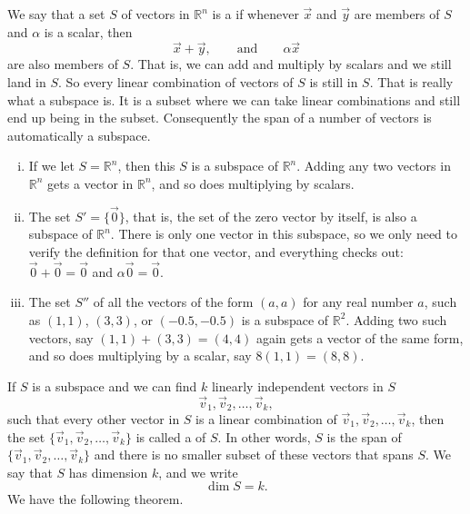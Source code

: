 We say that a set $S$ of vectors in ${\mathbb R}^n$ is a
\emph{} if
whenever $\vec{x}$ and $\vec{y}$ are members of $S$ and
$\alpha$ is a scalar, then
\begin{equation*}
\vec{x} + \vec{y}, \qquad \text{and} \qquad \alpha \vec{x}
\end{equation*}
are also members of $S$.  That is, we can add and multiply by scalars
and we still land in $S$.  So every linear combination of vectors of
$S$ is still in $S$.  That is really what a subspace is.  It is a subset
where we can take linear combinations and still end up being in the subset.
Consequently the span of a number of vectors is automatically a subspace.

\begin{example} \label{example:simplesubspaces}
\begin{enumerate}[(i)]
\item
If we let $S = {\mathbb R}^n$, then this $S$ is a subspace of
${\mathbb R}^n$.  Adding any two vectors in ${\mathbb R}^n$ gets a vector in
${\mathbb R}^n$, and so does multiplying by scalars.
\item
The set $S' = \{ \vec{0} \}$, that is,
the set of the zero vector by itself, is 
also a subspace of ${\mathbb R}^n$.  There is only one vector in this
subspace, so we only need to verify the definition for that one vector, and everything checks
out: $\vec{0}+\vec{0} = \vec{0}$ and $\alpha \vec{0} = \vec{0}$.
\item
The set $S''$ of all the vectors of the form
$(a,a)$ for any real number $a$, such as $(1,1)$, $(3,3)$, or $(-0.5,-0.5)$
is a subspace of ${\mathbb R}^2$.  Adding two such vectors, say
$(1,1)+(3,3) = (4,4)$ again gets a vector of the same form, and so does
multiplying by a scalar, say $8(1,1) = (8,8)$.
\end{enumerate}
\end{example}

If $S$ is a subspace and we can find $k$ linearly independent vectors in $S$
\begin{equation*}
\vec{v}_1, \vec{v}_2, \ldots, \vec{v}_k ,
\end{equation*}
such that every other vector in $S$ is a linear combination of $\vec{v}_1,
\vec{v}_2,\ldots, \vec{v}_k$,
then the set 
$\{ \vec{v}_1, \vec{v}_2, \ldots, \vec{v}_k \}$ is called a
\emph{} of $S$.  In other words, $S$
is the span of 
$\{ \vec{v}_1, \vec{v}_2, \ldots, \vec{v}_k \}$
and there is no smaller subset of these vectors that spans $S$.
We say that $S$ has dimension $k$,
and we write 
\begin{equation*}
\dim S = k .
\end{equation*}
We have the following theorem.

